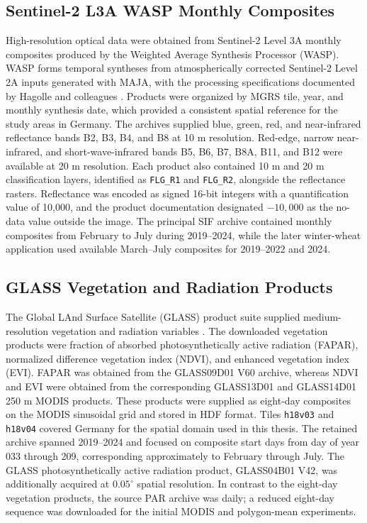 \subsection{Sentinel-2 L3A WASP Monthly Composites}

High-resolution optical data were obtained from Sentinel-2 Level 3A monthly composites produced by the Weighted Average Synthesis Processor (WASP). WASP forms temporal syntheses from atmospherically corrected Sentinel-2 Level 2A inputs generated with MAJA, with the processing specifications documented by Hagolle and colleagues \cite{hagolle_maja_2017,hagolle_wasp_2018}. Products were organized by MGRS tile, year, and monthly synthesis date, which provided a consistent spatial reference for the study areas in Germany. The archives supplied blue, green, red, and near-infrared reflectance bands B2, B3, B4, and B8 at 10 m resolution. Red-edge, narrow near-infrared, and short-wave-infrared bands B5, B6, B7, B8A, B11, and B12 were available at 20 m resolution. Each product also contained 10 m and 20 m classification layers, identified as \texttt{FLG\_R1} and \texttt{FLG\_R2}, alongside the reflectance rasters. Reflectance was encoded as signed 16-bit integers with a quantification value of 10,000, and the product documentation designated $-10{,}000$ as the no-data value outside the image. The principal SIF archive contained monthly composites from February to July during 2019--2024, while the later winter-wheat application used available March--July composites for 2019--2022 and 2024.

\subsection{GLASS Vegetation and Radiation Products}

The Global LAnd Surface Satellite (GLASS) product suite supplied medium-resolution vegetation and radiation variables \cite{liang_glass_2013,liang_glass_suite_2020}. The downloaded vegetation products were fraction of absorbed photosynthetically active radiation (FAPAR), normalized difference vegetation index (NDVI), and enhanced vegetation index (EVI). FAPAR was obtained from the GLASS09D01 V60 archive, whereas NDVI and EVI were obtained from the corresponding GLASS13D01 and GLASS14D01 250 m MODIS products. These products were supplied as eight-day composites on the MODIS sinusoidal grid and stored in HDF format. Tiles \texttt{h18v03} and \texttt{h18v04} covered Germany for the spatial domain used in this thesis. The retained archive spanned 2019--2024 and focused on composite start days from day of year 033 through 209, corresponding approximately to February through July. The GLASS photosynthetically active radiation product, GLASS04B01 V42, was additionally acquired at $0.05^{\circ}$ spatial resolution. In contrast to the eight-day vegetation products, the source PAR archive was daily; a reduced eight-day sequence was downloaded for the initial MODIS and polygon-mean experiments.

